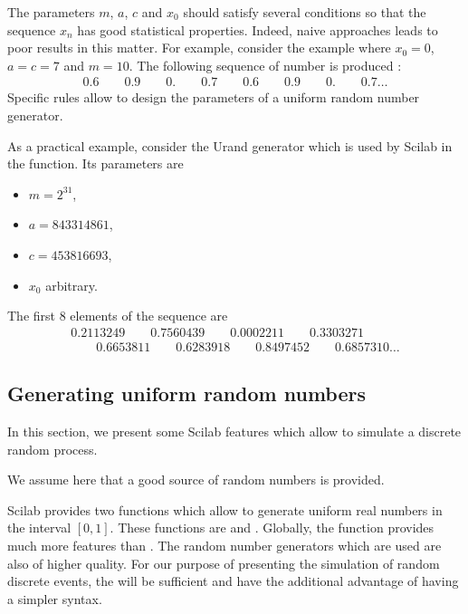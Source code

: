 The parameters $m$, $a$, $c$ and $x_0$ should satisfy
several conditions so that the sequence $x_n$ has 
good statistical properties. 
Indeed, naive approaches leads to poor results in this matter.
For example, consider the example where $x_0=0$, $a=c=7$ and $m=10$.
The following sequence of number is produced :
\begin{eqnarray}
    0.6   \qquad  0.9  \qquad  0. \qquad   0.7 \qquad   0.6   
    \qquad 0.9  \qquad  0. \qquad   0.7  \ldots
\end{eqnarray}
Specific rules allow to design the parameters of a uniform 
random number generator. 

As a practical example, consider the Urand generator \cite{891980} which is 
used by Scilab in the  function.
Its parameters are 
\begin{itemize}
\item $m=2^{31}$,
\item $a=843314861$,
\item $c=453816693$,
\item $x_0$ arbitrary.
\end{itemize}

The first 8 elements of the sequence are 
\begin{eqnarray}
    0.2113249  \qquad  0.7560439  \qquad  0.0002211 \qquad   0.3303271  \\
\qquad  0.6653811  \qquad  0.6283918  \qquad  0.8497452  \qquad  0.6857310  \ldots
\end{eqnarray}

\subsection{Generating uniform random numbers}

In this section, we present some Scilab features 
which allow to simulate a discrete random process.

We assume here that a good source of random numbers 
is provided. 

Scilab provides two functions which allow to generate 
uniform real numbers in the interval $[0,1]$. These functions 
are  and . 
Globally, the  function provides much more 
features than . The random number generators which
are used are also of higher quality.
For our purpose of presenting the simulation of random discrete events,
the  will be sufficient and have the additional
advantage of having a simpler syntax.

